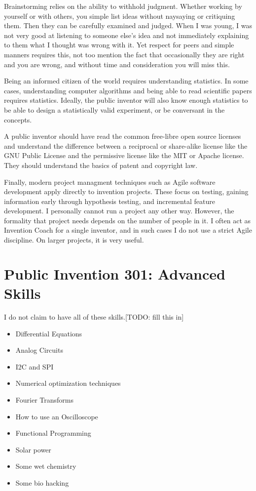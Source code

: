 \documentclass[
	fontsize=10pt, %
	twoside=false, %
	secnumdepth=1, %
]{kaobook}
\begin{document}
Brainstorming relies on the ability to withhold judgment.
Whether working by yourself or with others, you simple list ideas
without naysaying or critiquing them.
Then they can be carefully examined and judged.
When I was young, I was not very good at listening to someone else's
idea and not immediately explaining to them what I thought was wrong with it.
Yet respect for peers and simple manners requires this, not too mention
the fact that occasionally they are right and you are wrong, and without
time and consideration you will miss this.

Being an informed citizen of the world requires understanding statistics.
In some cases, understanding computer algorithms and being able to read
scientific papers requires statistics. Ideally, the public inventor
will also know enough statistics to be able to design a statistically
valid experiment, or be conversant in the concepts.

A public inventor should have read the common free-libre open
source licenses and understand the difference between a reciprocal or share-alike
license like the GNU Public License and the permissive license like the MIT
or Apache license. They should understand the basics of patent and copyright law.

Finally, modern project managment techniques such as Agile software development
apply directly to invention projects. These focus on testing,
gaining information early through hypothesis testing, and incremental
feature development. I personally cannot run a project any other way.
However, the formality that project needs depends on the number of people
in it. I often act as Invention Coach for a single inventor, and in such
cases I do not use a strict Agile discipline. On larger projects, it
is very useful.


\chapter{Public Invention 301: Advanced Skills}


I do not claim to have all of these skills.[TODO: fill this in]

\begin{itemize}
\item Differential Equations
\item Analog Circuits
  \item I2C and SPI
\item Numerical optimization techniques
\item Fourier Transforms
\item How to use an Oscilloscope
\item Functional Programming
\item Solar power
\item Some wet chemistry
  \item Some bio hacking
  \end{itemize}
\end{document}
